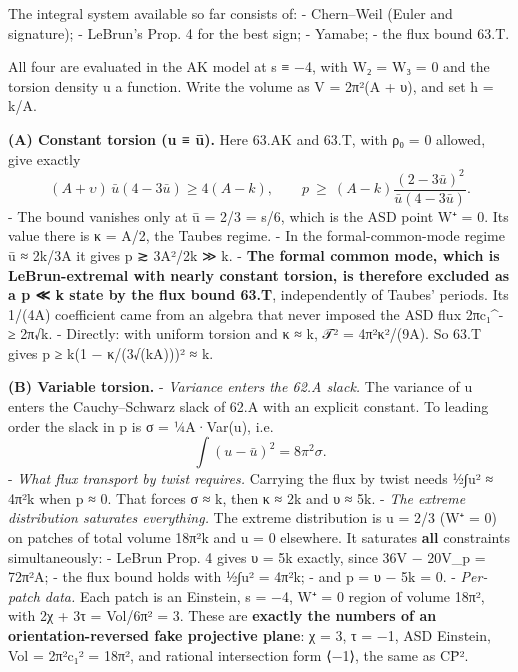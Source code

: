 \documentclass[
  10pt,
]{report}
\begin{document}
The integral system available so far consists of: - Chern--Weil (Euler
and signature); - LeBrun's Prop. 4 for the best sign; - Yamabe; - the
flux bound 63.T.

All four are evaluated in the AK model at s ≡ −4, with W₂ = W₃ = 0 and
the torsion density u a function. Write the volume as V = 2π²(A + υ),
and set h = k/A.

\textbf{(A) Constant torsion (u ≡ ū).} Here 63.AK and 63.T, with ρ₀ = 0
allowed, give exactly \[
(A+\upsilon)\,\bar u(4-3\bar u)\ge4(A-k),\qquad
p\ \ge\ (A-k)\frac{(2-3\bar u)^2}{\bar u(4-3\bar u)} .
\] - The bound vanishes only at ū = 2/3 = \textbar s\textbar/6, which is
the ASD point W⁺ = 0. Its value there is κ = A/2, the Taubes regime. -
In the formal-common-mode regime ū ≈ 2k/3A it gives p ≳ 3A²/2k ≫ k. -
\textbf{The formal common mode, which is LeBrun-extremal with nearly
constant torsion, is therefore excluded as a p ≪ k state by the flux
bound 63.T}, independently of Taubes' periods. Its 1/(4A) coefficient
came from an algebra that never imposed the ASD flux
2π\textbar c₁\^{}-\textbar{} ≥ 2π√k. - Directly: with uniform torsion
and κ ≈ k, 𝒯² = 4π²κ²/(9A). So 63.T gives p ≥ k(1 − κ/(3√(kA)))² ≈ k.

\textbf{(B) Variable torsion.} - \emph{Variance enters the 62.A slack.}
The variance of u enters the Cauchy--Schwarz slack of 62.A with an
explicit constant. To leading order the slack in p is σ = ¼A·Var(u),
i.e. \[
  \int(u-\bar u)^2=8\pi^2\sigma .
  \] - \emph{What flux transport by twist requires.} Carrying the flux
by twist needs ½∫u² ≈ 4π²k when p ≈ 0. That forces σ ≈ k, then κ ≈ 2k
and υ ≈ 5k. - \emph{The extreme distribution saturates everything.} The
extreme distribution is u = 2/3 (W⁺ = 0) on patches of total volume
18π²k and u = 0 elsewhere. It saturates \textbf{all} constraints
simultaneously: - LeBrun Prop. 4 gives υ = 5k exactly, since 36V −
20V\_p = 72π²A; - the flux bound holds with ½∫u² = 4π²k; - and p = υ −
5k = 0. - \emph{Per-patch data.} Each patch is an Einstein, s = −4, W⁺ =
0 region of volume 18π², with 2χ + 3τ = Vol/6π² = 3. These are
\textbf{exactly the numbers of an orientation-reversed fake projective
plane}: χ = 3, τ = −1, ASD Einstein, Vol = 2π²c₁² = 18π², and rational
intersection form ⟨−1⟩, the same as CP̄².
\end{document}
